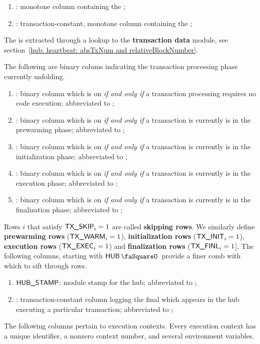 \begin{enumerate}
	\item \absTxNum{}: monotone column containing the \ABSTXNUM{};
	\item \relativeBlockNumber{}: transaction-constant, monotone column containing the \RELATIVEBLOCKNUMBER{};
\end{enumerate}
\saNote{} The \relativeBlockNumber{} is extracted through a lookup to the \textbf{transaction data} module, see section~\ref{hub: heartbeat: absTxNum and relativeBlockNumber}.

\noindent The following are binary colums indicating the transaction processing phase currently unfolding.
\begin{enumerate}[resume]
	\item \TXSKIP{}:
		binary column which is on \emph{if and only if} a transaction processing requires no code execution; abbreviated to \txSkip{};
	\item \TXWARM{}:
		binary column which is on \emph{if and only if} a transaction is currently is in the prewarming phase; abbreviated to \txWarm{};
	\item \TXINIT{}:
		binary column which is on \emph{if and only if} a transaction is currently is in the initialization phase; abbreviated to \txInit{};
	\item \TXEXEC{}:
		binary column which is on \emph{if and only if} a transaction is currently is in the execution phase; abbreviated to \txExec{};
	\item \TXFINL{}:
		binary column which is on \emph{if and only if} a transaction is currently is in the finalization phase; abbreviated to \txFinl{};
\end{enumerate}
Rows $i$ that satisfy $\textsf{TX}\textsf{\_SKIP}_{i} = 1$ are called \textbf{skipping rows}. We similarly define
\textbf{prewarming rows} ($\textsf{TX}\textsf{\_WARM}_{i} = 1$),
\textbf{initialization rows} ($\textsf{TX}\textsf{\_INIT}_{i} = 1$),
\textbf{execution rows} ($\textsf{TX}\textsf{\_EXEC}_{i} = 1$) and
\textbf{finalization rows} ($\textsf{TX}\textsf{\_FINL}_{i} = 1$].
The following columns, starting with $\hubStamp$ provide a finer comb with which to sift through rows. 
\begin{enumerate}[resume]
	\item $\textsf{HUB\_STAMP}$: module stamp for the hub; abbreviated to \hubStamp{};
	\item \TXENDSTAMP{}: transaction-constant column logging the final \hubStamp{} which appears in the hub executing a particular transaction; abbreviated to \txEndStamp{};
\end{enumerate}
The following columns pertain to execution contexts. Every execution context has a unique identifier, a nonzero context number, and several environment variables. 
